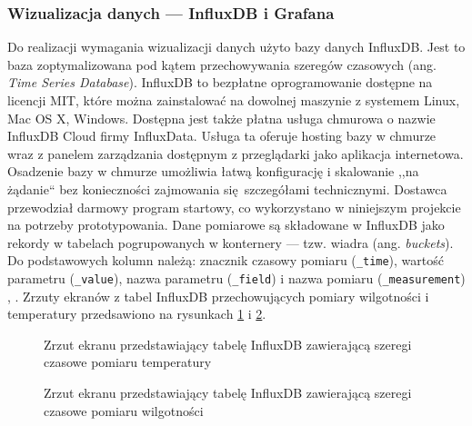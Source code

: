 \documentclass[a4paper, 12pt, twoside]{article}
\begin{document}
\subsubsection{Wizualizacja danych --- InfluxDB i Grafana}

Do realizacji wymagania wizualizacji danych użyto bazy danych InfluxDB.
Jest to baza zoptymalizowana pod kątem przechowywania szeregów czasowych
(ang. \emph{Time Series Database}). InfluxDB to bezpłatne
oprogramowanie dostępne na licencji MIT, które można zainstalować na dowolnej
maszynie z systemem Linux, Mac OS X, Windows. Dostępna jest także
płatna usługa chmurowa o nazwie InfluxDB Cloud firmy InfluxData. Usługa ta oferuje hosting
bazy w chmurze wraz z panelem zarządzania dostępnym z przeglądarki jako
aplikacja internetowa. Osadzenie bazy w chmurze umożliwia łatwą konfigurację
i skalowanie ,,na żądanie`` bez konieczności zajmowania się szczegółami technicznymi.
Dostawca przewodział darmowy program startowy, co wykorzystano w niniejszym projekcie
na potrzeby prototypowania. Dane pomiarowe są składowane w InfluxDB
jako rekordy w tabelach pogrupowanych w konternery --- tzw. wiadra (ang. \emph{buckets}).
Do podstawowych kolumn należą: znacznik czasowy pomiaru (\texttt{\_time}),
wartość parametru (\texttt{\_value}), nazwa parametru (\texttt{\_field}) i nazwa pomiaru (\texttt{\_measurement})
\cite{influx-db-cloud}, \cite{influx-db}.
Zrzuty ekranów z tabel InfluxDB przechowujących pomiary wilgotności i temperatury
przedsawiono na rysunkach \ref{fig:influx_1} i \ref{fig:influx_2}.

\begin{figure}[h]
      \centering
      \caption{Zrzut ekranu przedstawiający tabelę InfluxDB zawierającą szeregi czasowe pomiaru temperatury}
      \label{fig:influx_1}
\end{figure}

\begin{figure}[h]
      \centering
      \caption{Zrzut ekranu przedstawiający tabelę InfluxDB zawierającą szeregi czasowe pomiaru wilgotności}
      \label{fig:influx_2}
\end{figure}
\end{document}
